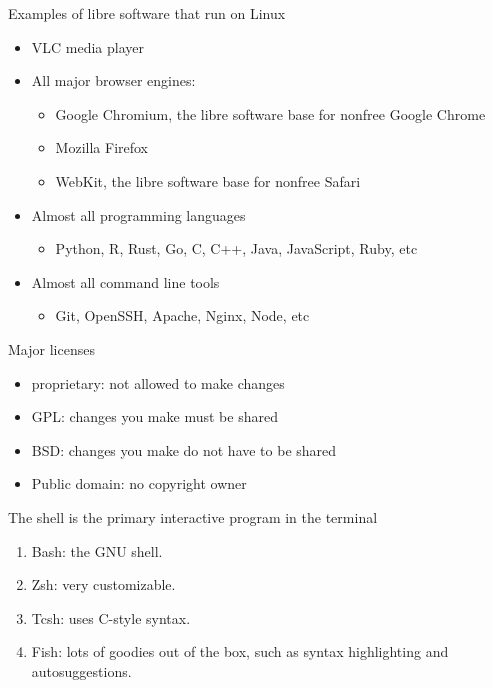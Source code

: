 \documentclass[presentation]{beamer}
\begin{document}
\begin{frame}[label={sec:org52739b9}]{Examples of libre software that run on Linux}
\begin{itemize}
\item VLC media player
\item All major browser engines:
\begin{itemize}
\item Google Chromium, the libre software base for nonfree Google Chrome
\item Mozilla Firefox
\item WebKit, the libre software base for nonfree Safari
\end{itemize}
\item Almost all programming languages
\begin{itemize}
\item Python, R, Rust, Go, C, C++, Java, JavaScript, Ruby, etc
\end{itemize}
\item Almost all command line tools
\begin{itemize}
\item Git, OpenSSH, Apache, Nginx, Node, etc
\end{itemize}
\end{itemize}
\end{frame}

\begin{frame}[label={sec:org3f6cafb}]{Major licenses}
\begin{itemize}
\item proprietary: not allowed to make changes
\item GPL: changes you make must be shared
\item BSD: changes you make do not have to be shared
\item Public domain: no copyright owner
\end{itemize}
\end{frame}

\begin{frame}[label={sec:org7b18c15}]{The shell is the primary interactive program in the terminal}
\begin{enumerate}
\item Bash: the GNU shell.
\item Zsh: very customizable.
\item Tcsh: uses C-style syntax.
\item Fish: lots of goodies out of the box, such as syntax highlighting and autosuggestions.
\end{enumerate}
\end{frame}
\end{document}

